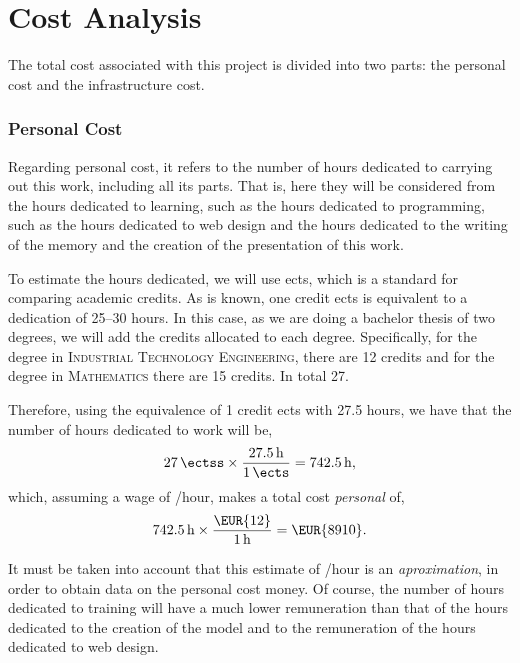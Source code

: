 \section{Cost Analysis}\label{sec:cost}

The total cost associated with this project is divided into two parts: the
personal cost and the infrastructure cost.

\subsubsection{Personal Cost}

Regarding personal cost, it refers to the number of hours dedicated to carrying
out this work, including all its parts. That is, here they will be considered
from the hours dedicated to learning, such as the hours dedicated to
programming, such as the hours dedicated to web design and the hours dedicated
to the writing of the memory and the creation of the presentation of this work.

To estimate the hours dedicated, we will use \gls{ects}, which is a standard
for comparing academic credits. As is known, one credit \gls{ects} is
equivalent to a dedication of 25--30 hours. In this case, as we are doing a
bachelor thesis of two degrees, we will add the credits allocated to each
degree. Specifically, for the degree in \textsc{Industrial Technology
  Engineering}, there are 12 credits and for the degree in \textsc{Mathematics}
there are 15 credits. In total \SI{27}{\ectss}.

Therefore, using the equivalence of 1 credit \gls{ects} with 27.5 hours, we
have that the number of hours dedicated to work will be,
\begin{equation}
  \SI{27}{\ectss} \times \frac{\SI{27.5}{\hour}}{\SI{1}{\ects}} =
  \SI{742.5}{\hour},
\end{equation}
which, assuming a wage of /hour, makes a total cost \emph{personal} of,
\begin{equation}
  \SI{742.5}{\hour} \times \frac{\text{\EUR{12}}}{\SI{1}{\hour}} =
  \text{\EUR{\num{8910}}}.
\end{equation}

\begin{remarkBox}
  It must be taken into account that this estimate of /hour is an
  \emph{aproximation}, in order to obtain data on the personal cost money. Of
  course, the number of hours dedicated to training will have a much lower
  remuneration than that of the hours dedicated to the creation of the model
  and to the remuneration of the hours dedicated to web design.
\end{remarkBox}

